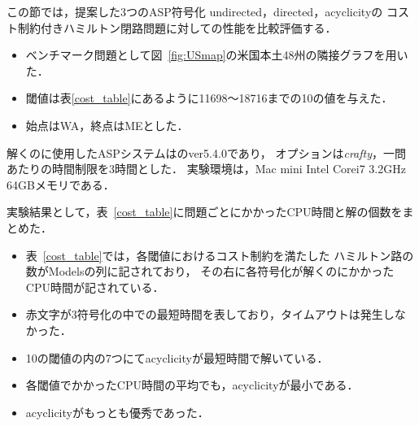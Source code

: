 
この節では，提案した3つのASP符号化
\textsf{undirected}，\textsf{directed}，\textsf{acyclicity}の
コスト制約付きハミルトン閉路問題に対しての性能を比較評価する．

\begin{itemize}
\item ベンチマーク問題として図~\ref{fig:USmap}の米国本土48州の隣接グラフを用いた．
\item 閾値は表\ref{cost_table}にあるように11698〜18716までの10の値を与えた．
\item 始点はWA，終点はMEとした．
\end{itemize}

解くのに使用したASPシステムは{\clingo}のver5.4.0であり，
オプションは\textit{crafty}，一問あたりの時間制限を3時間とした．
実験環境は，Mac mini Intel Corei7 3.2GHz 64GBメモリである．

実験結果として，表~\ref{cost_table}に問題ごとにかかったCPU時間と解の個数をまとめた．

\begin{itemize}
\item 表~\ref{cost_table}では，各閾値におけるコスト制約を満たした
  ハミルトン路の数がModelsの列に記されており，
  その右に各符号化が解くのにかかったCPU時間が記されている．
\item 赤文字が3符号化の中での最短時間を表しており，タイムアウトは発生しなかった．
\item 10の閾値の内の7つにて\textsf{acyclicity}が最短時間で解いている．
\item 各閾値でかかったCPU時間の平均でも，\textsf{acyclicity}が最小である．
\item \textsf{acyclicity}がもっとも優秀であった．
\end{itemize}

